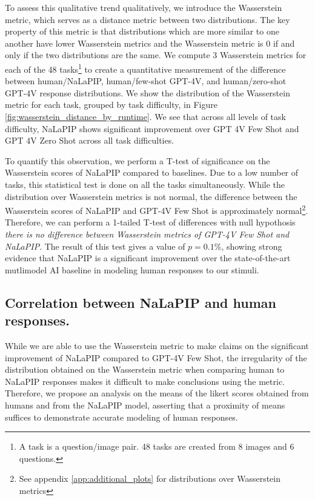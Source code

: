 \documentclass[10pt,letterpaper]{article}
\begin{document}
To assess this qualitative trend qualitatively, we introduce the Wasserstein metric, which serves as a distance metric between two distributions. The key property of this metric is that distributions which are more similar to one another have lower Wasserstein metrics and the Wasserstein metric is 0 if and only if the two distributions are the same. We compute 3 Wasserstein metrics for each of the 48 tasks\footnote{A task is a question/image pair. 48 tasks are created from 8 images and 6 questions.} to create a quantitative measurement of the difference between human/NaLaPIP, human/few-shot GPT-4V, and human/zero-shot GPT-4V response distributions. We show the distribution of the Wasserstein metric for each task, grouped by task difficulty, in Figure \ref{fig:wasserstein_distance_by_runtime}. We see that across all levels of task difficulty, NaLaPIP shows significant improvement over GPT 4V Few Shot and GPT 4V Zero Shot across all task difficulties. 

To quantify this observation, we perform a T-test of significance on the Wasserstein scores of NaLaPIP compared to baselines. Due to a low number of tasks, this statistical test is done on all the tasks simultaneously. While the distribution over Wasserstein metrics is not normal, the difference between the Wasserstein scores of NaLaPIP and GPT-4V Few Shot is approximately normal\footnote{See appendix \autoref{app:additional_plots} for distributions over Wasserstein metrics}. Therefore, we can perform a 1-tailed T-test of differences with null hypothosis \textit{there is no difference between Wasserstein metrics of GPT-4V Few Shot and NaLaPIP}. The result of this test gives a value of $p=0.1\%$, showing strong evidence that NaLaPIP is a significant improvement over the state-of-the-art mutlimodel AI baseline in modeling human responses to our stimuli. 

\subsection{Correlation between NaLaPIP and human responses.}

While we are able to use the Wasserstein metric to make claims on the significant improvement of NaLaPIP compared to GPT-4V Few Shot, the irregularity of the distribution obtained on the Wasserstein metric when comparing human to NaLaPIP responses makes it difficult to make conclusions using the metric. Therefore, we propose an analysis on the means of the likert scores obtained from humans and from the NaLaPIP model, asserting that a proximity of means suffices to demonstrate accurate modeling of human responses. 
\end{document}
